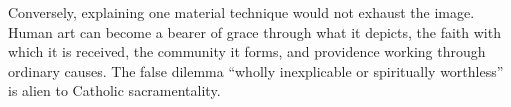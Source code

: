 Conversely, explaining one material technique would not exhaust the image. Human art can become a bearer of grace through what it depicts, the faith with which it is received, the community it forms, and providence working through ordinary causes. The false dilemma “wholly inexplicable or spiritually worthless” is alien to Catholic sacramentality.

